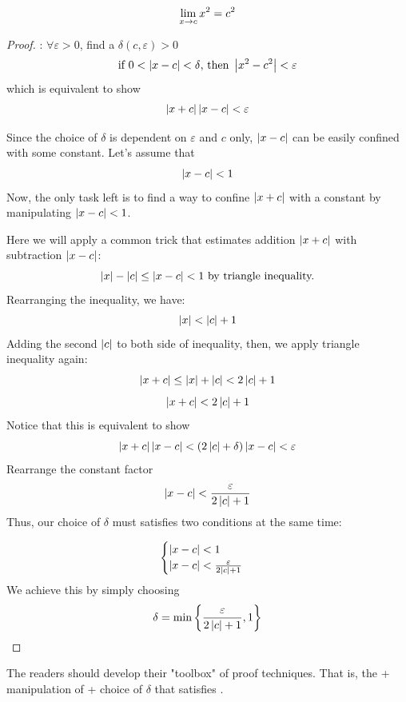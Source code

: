\documentclass[a4paper,12pt]{article}
\begin{document}
\newpage
\begin{example}
    \[\lim_{x\rightarrow c } {x^2}=c^2\]
    \begin{proof}
        : \(\forall \varepsilon>0\), find a \(\delta(c,\varepsilon)>0\) \st
        \[\text{if }0<\left\lvert x-c\right\rvert<\delta\text{, then }\left\lvert x^2-c^2\right\rvert<\varepsilon\]
        which is equivalent to show
        \[\left\lvert x+c\right\rvert\left\lvert x-c\right\rvert<\varepsilon\]

        Since the choice of \(\delta\) is dependent on \(\varepsilon\) and \(c\) only, \(\left\lvert x-c\right\rvert\) can be easily confined with some constant. 
        Let's assume that
        \[\left\lvert x-c\right\rvert<1\]
        Now, the only task left is to find a way to confine \(\left\lvert x+c\right\rvert\) with a constant by manipulating \(\left\lvert x-c\right\rvert<1\). 

        Here we will apply a common trick that estimates addition \(\left\lvert x+c\right\rvert\) with subtraction \(\left\lvert x-c\right\rvert\):
        \[\left\lvert x\right\rvert-\left\lvert c\right\rvert \le \left\lvert x-c\right\rvert < 1 \text{ by triangle inequality.}\]
        Rearranging the inequality, we have:
        \[\left\lvert x\right\rvert<\left\lvert c\right\rvert+1\]
        Adding the second \(\left\lvert c\right\rvert\) to both side of inequality, then, we apply triangle inequality again:
        \[\left\lvert x+c\right\rvert\le\left\lvert x\right\rvert+\left\lvert c\right\rvert<2\left\lvert c\right\rvert+1\]
        \[\left\lvert x+c\right\rvert<2\left\lvert c\right\rvert+1\]
        Notice that this is equivalent to show
        \[\left\lvert x+c\right\rvert\left\lvert x-c\right\rvert<(2\left\lvert c\right\rvert+\delta)\left\lvert x-c\right\rvert<\varepsilon\]
        Rearrange the constant factor \[\left\lvert x-c\right\rvert<\frac{\varepsilon}{2\left\lvert c\right\rvert+1}\]
        Thus, our choice of \(\delta\) must satisfies two conditions at the same time:

        \begin{equation*}
            \begin{cases}
                \left\lvert x-c\right\rvert<1 \\
                \left\lvert x-c\right\rvert<\frac{\varepsilon}{2\left\lvert c\right\rvert+1}
            \end{cases}
        \end{equation*}
        We achieve this by simply choosing
        \[\delta=\min\left\{\frac{\varepsilon}{2\left\lvert c\right\rvert+1},1\right\}\]
    \end{proof}
\end{example}

\begin{remark}
    The readers should develop their "toolbox" of proof techniques. 
    That is, the  + manipulation of  + choice of \(\delta\) that satisfies .
\end{remark}
\end{document}
